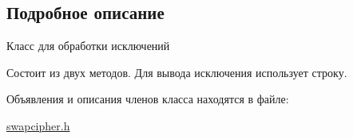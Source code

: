 \subsection{Подробное описание}
Класс для обработки исключений 

Состоит из двух методов. Для вывода исключения использует строку. 

Объявления и описания членов класса находятся в файле\+:\begin{DoxyCompactItemize}
\item 
\hyperlink{swapcipher_8h}{swapcipher.\+h}\end{DoxyCompactItemize}
